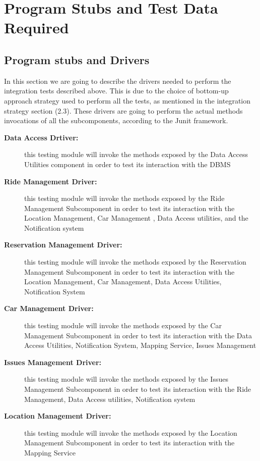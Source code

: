 \documentclass{article}
\begin{document}
\begin{flushleft}
\begin{itemize}
  \end{itemize}
  
  
  
  
  
  
  \newpage
  
  \section{Program Stubs and Test Data Required }    %
  
  
  
  
  
   
  \subsection{Program stubs and Drivers}
  In this section we are going to describe the drivers needed to perform the integration tests described above. This is due to the choice of bottom-up approach strategy used to perform all the tests, as mentioned in the integration strategy section (2.3).
  These drivers are going to perform the actual methods invocations of all the subcomponents, according to the Junit framework.
  
  \begin{description}
  
  
    \item[\textbf{Data Access Drtiver:}] this testing module will invoke the methods exposed by the Data Access Utilities component in order to test its interaction with the DBMS
    
    
    
    \item[\textbf{Ride Management Driver:}] this testing module will invoke the methods exposed by the Ride Management Subcomponent  in order to test its interaction with the Location Management, Car Management , Data Access utilities, and the Notification system
    \item[\textbf{Reservation Management Driver:}] this testing module will invoke the methods exposed by the Reservation Management Subcomponent  in order to test its interaction with the Location Management, Car Management, Data Access Utilities, Notification System
   \item[\textbf{Car Management Driver:}] this testing module will invoke the methods exposed by the Car Management Subcomponent  in order to test its interaction with the Data Access Utilities, Notification System, Mapping Service, Issues Management
   \item[\textbf{Issues Management Driver:}] this testing module will invoke the methods exposed by the Issues Management Subcomponent  in order to test its interaction with the Ride Management, Data Access utilities, Notification system
   \item[\textbf{Location Management Driver:}] this testing module will invoke the methods exposed by the Location Management Subcomponent  in order to test its interaction with the Mapping Service
   

\end{description}
\end{flushleft}
\end{document}
